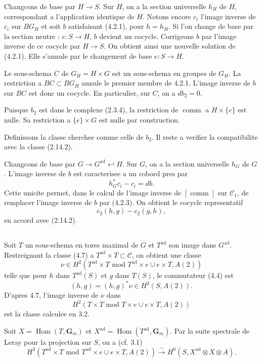 \documentclass[11pt,a4paper]{article}
\theoremstyle{plain}
\theoremstyle{definition}
\DeclareMathOperator{\Hom}{Hom}
\DeclareMathOperator{\ad}{ad}
\DeclareMathOperator{\comm}{comm}
\begin{document}
Changcons de base par $H \to S$. Sur $H$, on a la section universelle $h_H$ de $H$, correspondant a l'application identique de $H$. Notons encore $c_i$ l'image inverse de $c_i$ sur $BG_H$ et soit $b$ satisfaisant (4.2.1), pour $h = h_H$. Si l'on change de base par la section neutre : $e : S \to H$, $b$ devient un cocycle. Corrigeons $b$ par l'image inverse de ce cocycle par $H \to S$. On obtient ainsi une nouvelle solution de (4.2.1). Elle s'annule par le changement de base $e : S \to H$.

Le sous-schema $C$ de $G_H = H \times G$ est un sous-schema en groupes de $G_H$. La restriction a $BC \subset BG_H$ annule le premier membre de 4.2.1. L'image inverse de $b$ sur $BC$ est donc un cocycle. En particulier, sur $C$, on a $db_2 = 0$.

Puisque $b_2$ est dans le complexe (2.3.4), la restriction de $\comm$ a $H \times \{e\}$ est nulle. Sa restriction a $\{e\} \times G$ est nulle par construction.

Definissons la classe cherchee comme celle de $b_2$. Il reste a verifier la compatibilite avec la classe (2.14.2).

Changcons de base par $G \to G^{\ad} \hookleftarrow H$. Sur $G$, on a la section universelle $h_G$ de $G$. L'image inverse de $b$ est caracterisee a un cobord pres par
\[
h_G^* c_i - c_i = db.
\]
Cette unicite permet, dans le calcul de l'image inverse de $[\comm]$ sur $\mathscr{C}_1$, de remplacer l'image inverse de $b$ par (4.2.3). On obtient le cocycle representatif
\[
c_2(h, g) - c_2(g, h),
\]
en accord avec (2.14.2).

\subsection{}\label{4.8}

Soit $T$ un sous-schema en tores maximal de $G$ et $T^{\ad}$ son image dans $G^{\ad}$. Restreignant la classe (4.7) a $T^{\ad} \times T \subset \mathscr{C}$, on obtient une classe
\begin{equation}\label{4.8.1}
\nu \in H^2(T^{\ad} \times T \text{ mod } T^{\ad} \times e \cup e \times T, A(2))
\end{equation}
telle que pour $h$ dans $T^{\ad}(S)$ et $g$ dans $T(S)$, le commutateur (4.4) est
\[
(h, g) = (h, g)^* \nu \in H^2(S, A(2)).
\]
D'apres 4.7, l'image inverse de $\nu$ dans
\[
H^2(T \times T \text{ mod } T \times e \cup e \times T, A(2))
\]
est la classe calculee en 3.2.

Soit $X = \Hom(T, \mathbf{G}_m)$ et $X^{\ad} = \Hom(T^{\ad}, \mathbf{G}_m)$. Par la suite spectrale de Leray pour la projection sur $S$, on a (cf. 3.1)
\begin{equation}\label{4.8.2}
H^2(T^{\ad} \times T \text{ mod } T^{\ad} \times e \cup e \times T, A(2)) \xrightarrow{\sim} H^0(S, X^{\ad} \otimes X \otimes A).
\end{equation}
\end{document}
